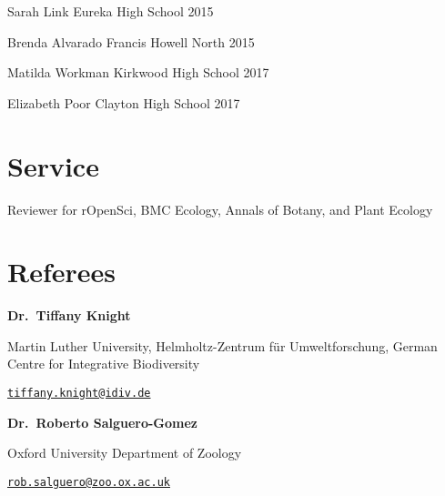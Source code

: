 \documentclass[11pt,]{article}
\begin{document}
Sarah Link \hfill Eureka High School 2015

Brenda Alvarado \hfill Francis Howell North 2015

Matilda Workman \hfill Kirkwood High School 2017

Elizabeth Poor \hfill Clayton High School 2017

\hypertarget{service}{%
\section{Service}\label{service}}

Reviewer for rOpenSci, BMC Ecology, Annals of Botany, and Plant Ecology

\hypertarget{referees}{%
\section{Referees}\label{referees}}

\textbf{Dr.~Tiffany Knight}

Martin Luther University, Helmholtz-Zentrum für Umweltforschung, German
Centre for Integrative Biodiversity

\href{mailto:tiffany.knight@idiv.de}{\nolinkurl{tiffany.knight@idiv.de}}

\textbf{Dr.~Roberto Salguero-Gomez}

Oxford University Department of Zoology

\href{mailto:rob.salguero@zoo.ox.ac.uk}{\nolinkurl{rob.salguero@zoo.ox.ac.uk}}
\end{document}
